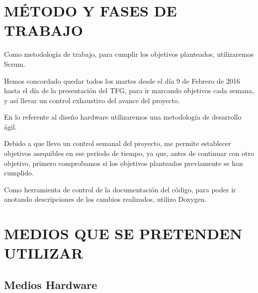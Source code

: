 \documentclass{pre-tfg}
\begin{document}





\section{MÉTODO Y FASES DE TRABAJO}

Como metodología de trabajo, para cumplir los objetivos planteados, utilizaremos Scrum. 

Hemos concordado quedar todos los martes desde el día 9 de Febrero de 2016 hasta el día de la presentación del TFG, para ir marcando objetivos cada semana, y así llevar un control exhaustivo del avance del proyecto.

En lo referente al diseño hardware utilizaremos una metodología de desarrollo ágil.

Debido a que llevo un control semanal del proyecto, me permite establecer objetivos asequibles en ese periodo de tiempo, ya que, antes de continuar con otro objetivo, primero comprobamos si los objetivos planteados previamente se han cumplido.

Como herramienta de control de la documentación del código, para poder ir anotando descripciones de los cambios realizados, utilizo Doxygen.


\section{MEDIOS QUE SE PRETENDEN UTILIZAR}

\subsection{Medios Hardware}
\end{document}
